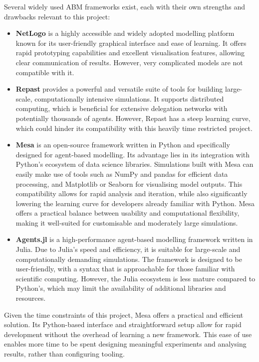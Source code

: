 Several widely used ABM frameworks exist, each with their own strengths and drawbacks relevant to this project:
\begin{itemize}
    \item \textbf{NetLogo} \citep{netlogo} is a highly accessible and widely adopted modelling platform known for its user-friendly graphical interface and ease of learning. It offers rapid prototyping capabilities and excellent visualisation features, allowing clear communication of results. However, very complicated models are not compatible with it.
    \item \textbf{Repast} \citep{repast} provides a powerful and versatile suite of tools for building large-scale, computationally intensive simulations. It supports distributed computing, which is beneficial for extensive delegation networks with potentially thousands of agents. However, Repast has a steep learning curve, which could hinder its compatibility with this heavily time restricted project.
    \item \textbf{Mesa} \citep{kazil_utilizing_2020} is an open-source framework written in Python and specifically designed for agent-based modelling. Its advantage lies in its integration with Python's ecosystem of data science libraries. Simulations built with Mesa can easily make use of tools such as NumPy and pandas for efficient data processing, and Matplotlib or Seaborn for visualising model outputs. This compatibility allows for rapid analysis and iteration, while also significantly lowering the learning curve for developers already familiar with Python. Mesa offers a practical balance between usability and computational flexibility, making it well-suited for customisable and moderately large simulations.
    \item \textbf{Agents.jl} \citep{agentsjl} is a high-performance agent-based modelling framework written in Julia. Due to Julia's speed and efficiency, it is suitable for large-scale and computationally demanding simulations. The framework is designed to be user-friendly, with a syntax that is approachable for those familiar with scientific computing. However, the Julia ecosystem is less mature compared to Python's, which may limit the availability of additional libraries and resources. 
\end{itemize}
Given the time constraints of this project, Mesa offers a practical and efficient solution. Its Python-based interface and straightforward setup allow for rapid development without the overhead of learning a new framework. This ease of use enables more time to be spent designing meaningful experiments and analysing results, rather than configuring tooling.
